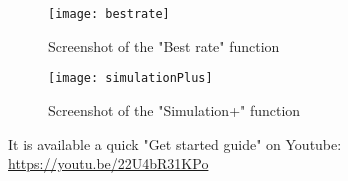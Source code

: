 \documentclass[a4paper,12pt]{article}
\begin{document}
\begin{figure}[H]
	\centering
   	 \texttt{[image: bestrate]}
	\caption{Screenshot of the "Best rate" function}
\end{figure}

\begin{figure}[H]
	\centering
   	 \texttt{[image: simulationPlus]}
	\caption{Screenshot of the "Simulation+" function}
\end{figure}

It is available a quick "Get started guide" on Youtube: \href{https://youtu.be/22U4bR31KPo}{https://youtu.be/22U4bR31KPo} 

\newpage
\end{document}
